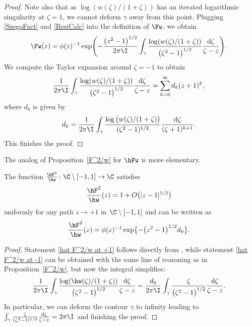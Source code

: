 \begin{proof}
Note also that as $\log(w(\zeta)/(1+\zeta))$ has an iterated logarithmic singularity at $\zeta = 1$, we cannot deform $\gamma$ away from this point. Plugging \eqref{SzegoFact} and \eqref{ResiCalc} into the definition of $\Fw$, we obtain
\begin{align*}
 \Fw(z) = \phi(z)^{-1} \exp \Biggl( - \frac{\big(z^2-1\big)^{1/2}}{2\pi\I} \int_\gamma\frac{\log(w(\zeta)/(1+\zeta))}{\big(\zeta^2-1\big)^{1/2}} \frac{{\rm d}\zeta}{\zeta-z} \Biggr).
\end{align*}
We compute the Taylor expansion around $\zeta = -1$ to obtain
\begin{align*}
 \frac{1}{2\pi\I} \int_\gamma\frac{\log(w(\zeta)/(1+\zeta))}{\big(\zeta^2-1\big)^{1/2}} \frac{{\rm d}\zeta}{\zeta-z} = \sum_{k=0}^\infty d_k (z+1)^k,
\end{align*}
where $d_k$ is given by
\begin{align*}
 d_k = \frac{1}{2\pi\I} \int_\gamma \frac{\log\big(w(\zeta)/(1+\zeta)\big)}{(\zeta^2-1)^{1/2}}\frac{{\rm d}\zeta}{(\zeta+1)^{k+1}}.
\end{align*}
This finishes the proof.
\end{proof}

The analog of Proposition~\ref{F^2/w} for $\hFw$ is more elementary.

\begin{Proposition}
The function $\frac{\hF^2}{\hw} \colon \C \setminus [-1,1] \to \C$ satisfies
\begin{align}\label{hat F^2/w at +1}
 \frac{\hF^2}{\hw}(z) = 1 + O\big(|z-1|^{1/2}\big)
\end{align}
uniformly for any path $z \to +1$ in $\C \setminus [-1,1]$ and can be written as
\begin{align}\label{hat F^2/w at -1}
 \frac{\hF^2}{\hw}(z) = \phi(z)^{-1}\exp\bigl\lbrace-\big(z^2-1\big)^{1/2}d_0\bigr\rbrace.
\end{align}
\end{Proposition}
\begin{proof}
Statement \eqref{hat F^2/w at +1} follows directly from \cite[Lemma~6.4]{KMVV}, while statement \eqref{hat F^2/w at -1} can be obtained with the same line of reasoning as in Proposition~\ref{F^2/w}, but now the integral simplifies:
\begin{align*}
 \frac{1}{2\pi\I} \int_\gamma\frac{\log(\hw(\zeta)/(1+\zeta))}{\big(\zeta^2-1\big)^{1/2}} \frac{{\rm d}\zeta}{\zeta-z} = \frac{d_0}{2\pi\I} \int_\gamma\frac{\zeta}{\big(\zeta^2-1\big)^{1/2}} \frac{{\rm d}\zeta}{\zeta-z}.
\end{align*}
In particular, we can deform the contour $\gamma$ to infinity leading to $\int_\gamma\frac{\zeta}{(\zeta^2-1)^{1/2}} \frac{{\rm d}\zeta}{\zeta-z} = 2\pi\I$ and finishing the proof.
\end{proof}

